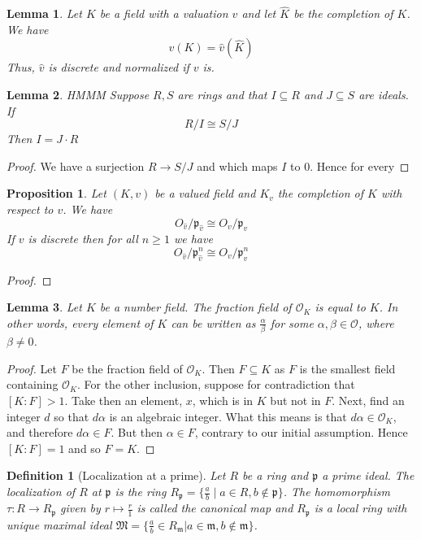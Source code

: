 \documentclass{article}
\newtheorem{definition}{Definition}[section]
\newtheorem{proposition}{Proposition}[section]
\newtheorem{lemma}{Lemma}[section]
\newcommand{\mfrak}[1]{\mathfrak{#1}}
\newcommand{\mcal}[1]{\mathcal{#1}}
\begin{document}
\begin{lemma} \label{lem: Image of valuation and completed valuation are the same}
    Let $K$ be a field with a valuation $v$ and let $\hat K$ be the completion of $K$. We have 
    $$v(K) = \hat v(\hat K)$$
    Thus, $\hat v$ is discrete and normalized if $v$ is.
\end{lemma}

\begin{lemma}
    HMMM
    Suppose $R,S$ are rings and that $I \subseteq R$ and $J \subseteq S$ are ideals. If 
    $$R / I \cong S / J$$
    Then $I = J \cdot R$
\end{lemma}
\begin{proof}
    We have a surjection $R \to S / J$ and which maps $I$ to 0. Hence for every 
\end{proof}


\begin{proposition}\label{prop: Isomorphism of residue fields valued field and its completion}
    Let $(K, v)$ be a valued field and $K_v$ the completion of $K$ with respect to $v$. We have
    $$O_{\hat v} / \mfrak p_{\hat v} \cong O_v / \mfrak p_v$$
    If $v$ is discrete then for all $n \geq 1$ we have
    $$O_{\hat v} / \mfrak p_{\hat v}^n \cong O_v / \mfrak p_v^n$$
\end{proposition}
\begin{proof}
    
\end{proof}


\begin{lemma} \label{lem: Fraction field of ring of integers is number field}
    Let $K$ be a number field. The fraction field of $\mcal O_K$ is equal to $K$. In other words, every element of $K$ can be written as $\frac{\alpha}{\beta}$ for some $\alpha, \beta \in \mcal O$, where $\beta \neq 0$.
\end{lemma}
\begin{proof}
    Let $F$ be the fraction field of $\mcal O_K$. Then $F \subseteq K$ as $F$ is the smallest field containing $\mcal O_K$. For the other inclusion, suppose for contradiction that $[K : F] > 1$. Take then an element, $x$, which is in $K$ but not in $F$. Next, find an integer $d$ so that $d \alpha$ is an algebraic integer. What this means is that $d \alpha \in \mcal O_K$, and therefore $d \alpha \in F$. But then $\alpha \in F$, contrary to our initial assumption. Hence $[K : F] = 1$ and so $F = K$.
\end{proof}


\begin{definition}[Localization at a prime]
    Let $R$ be a ring and $\mfrak p$ a prime ideal. The localization of $R$ at $\mfrak{p}$ is the ring $R_\mfrak p = \{\frac{a}{b} \mid a \in R, b \notin \mfrak p \}$. The homomorphism $\tau : R \to R_\mfrak p$ given by $r \mapsto \frac{r}{1}$ is called the canonical map and $R_\mfrak p$ is a local ring with unique maximal ideal $\mfrak M = \{\frac{a}{b} \in R_\mfrak m | a \in \mfrak m, b \notin \mfrak m \}$.
\end{definition}
\end{document}
